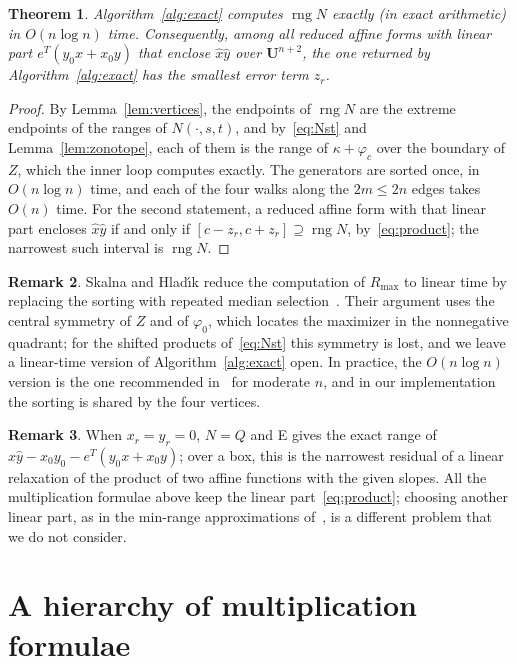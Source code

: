 \documentclass[10pt]{article}
\newtheorem{theorem}{Theorem}
\theoremstyle{definition}
\newtheorem{remark}[theorem]{Remark}
\newcommand{\U}{\mathbf{U}}
\newcommand{\rng}{\operatorname{rng}}
\begin{document}
\begin{theorem}
\label{thm:exact}
Algorithm~\ref{alg:exact} computes $\rng N$ exactly (in exact arithmetic) in $O(n\log n)$ time. Consequently, among all reduced affine forms with linear part $e^T(y_0x+x_0y)$ that enclose $\hat x\hat y$ over $\U^{n+2}$, the one returned by Algorithm~\ref{alg:exact} has the smallest error term $z_r$.
\end{theorem}
\begin{proof}
By Lemma~\ref{lem:vertices}, the endpoints of $\rng N$ are the extreme endpoints of the ranges of $N(\cdot,s,t)$, and by~\eqref{eq:Nst} and Lemma~\ref{lem:zonotope}, each of them is the range of $\kappa+\varphi_c$ over the boundary of $Z$, which the inner loop computes exactly. The generators are sorted once, in $O(n\log n)$ time, and each of the four walks along the $2m\le 2n$ edges takes $O(n)$ time. For the second statement, a reduced affine form with that linear part encloses $\hat x\hat y$ if and only if $[c-z_r,c+z_r]\supseteq\rng N$, by~\eqref{eq:product}; the narrowest such interval is $\rng N$.
\end{proof}

\begin{remark}
Skalna and Hlad\'{\i}k reduce the computation of $R_{\max}$ to linear time by replacing the sorting with repeated median selection~\cite[Prop.~8]{skalna2017new}. Their argument uses the central symmetry of $Z$ and of $\varphi_0$, which locates the maximizer in the nonnegative quadrant; for the shifted products of~\eqref{eq:Nst} this symmetry is lost, and we leave a linear-time version of Algorithm~\ref{alg:exact} open. In practice, the $O(n\log n)$ version is the one recommended in~\cite{skalna2017new} for moderate $n$, and in our implementation the sorting is shared by the four vertices.
\end{remark}

\begin{remark}
When $x_r=y_r=0$, $N=Q$ and E gives the exact range of $\hat x\hat y - x_0y_0 - e^T(y_0x+x_0y)$; over a box, this is the narrowest residual of a linear relaxation of the product of two affine functions with the given slopes. All the multiplication formulae above keep the linear part~\eqref{eq:product}; choosing another linear part, as in the min-range approximations of~\cite{stolfi1997self,skalna2013minrange}, is a different problem that we do not consider.
\end{remark}

\section{A hierarchy of multiplication formulae}
\label{sec:hierarchy}
\end{document}
